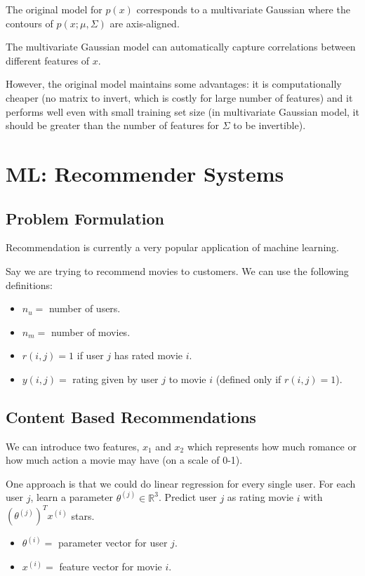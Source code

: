 The original model for $p(x)$ corresponds to a multivariate Gaussian where the contours of $p(x;\mu,\Sigma)$ are axis-aligned.

The multivariate Gaussian model can automatically capture correlations between different features of $x$.

However, the original model maintains some advantages: it is computationally cheaper (no matrix to invert, which is costly for large number of features) and it performs well even with small training set size (in multivariate Gaussian model, it should be greater than the number of features for $\Sigma$ to be invertible).

\section{ML: Recommender Systems}
\subsection{Problem Formulation}
Recommendation is currently a very popular application of machine learning.

Say we are trying to recommend movies to customers. We can use the following definitions:
\begin{itemize}
\item $n_u =$ number of users.
\item $n_m =$ number of movies.
\item $r(i,j) = 1$ if user $j$ has rated movie $i$.
\item $y(i,j) = $ rating given by user $j$ to movie $i$ (defined only if $r(i,j) = 1$).
\end{itemize}

\subsection{Content Based Recommendations}
We can introduce two features, $x_1$ and $x_2$ which represents how much romance or how much action a movie may have (on a scale of 0-1).

One approach is that we could do linear regression for every single user. For each user $j$, learn a parameter $\theta^{(j)} \in \mathbb{R}^3$. Predict user $j$ as rating movie $i$ with $(\theta^{(j)})^Tx^{(i)}$ stars.

\begin{itemize}
\item $\theta^{(i)} = $ parameter vector for user $j$.
\item $x^{(i)} = $ feature vector for movie $i$.
\end{itemize}

